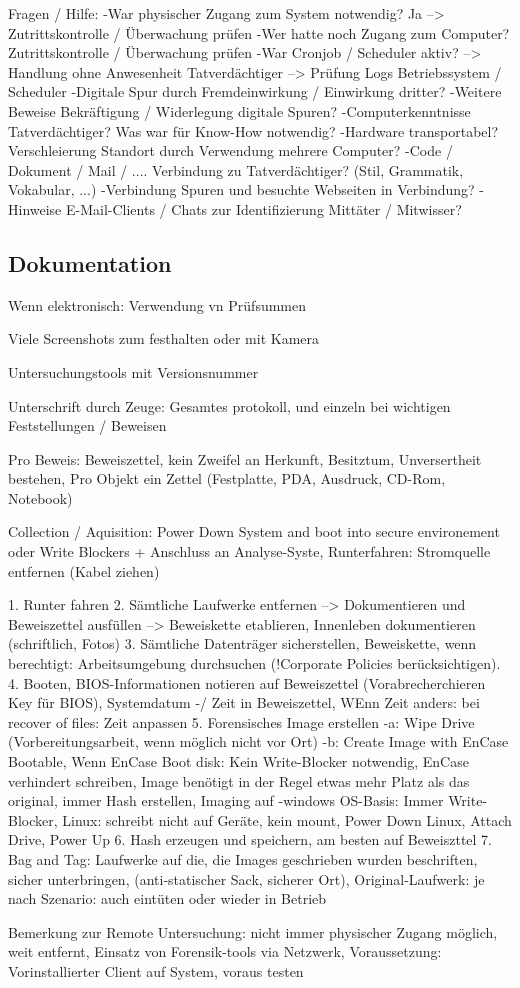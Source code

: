 Fragen / Hilfe:
-War physischer Zugang zum System notwendig? Ja --> Zutrittskontrolle / Überwachung prüfen
-Wer hatte noch Zugang zum Computer? Zutrittskontrolle / Überwachung prüfen
-War Cronjob / Scheduler aktiv? --> Handlung ohne Anwesenheit Tatverdächtiger --> Prüfung Logs Betriebssystem / Scheduler
-Digitale Spur durch Fremdeinwirkung / Einwirkung dritter?
-Weitere Beweise Bekräftigung / Widerlegung digitale Spuren?
-Computerkenntnisse Tatverdächtiger? Was war für Know-How notwendig?
-Hardware transportabel? Verschleierung Standort durch Verwendung mehrere Computer?
-Code / Dokument / Mail / .... Verbindung zu Tatverdächtiger? (Stil, Grammatik, Vokabular, ...)
-Verbindung Spuren und besuchte Webseiten in Verbindung?
-Hinweise E-Mail-Clients / Chats zur Identifizierung Mittäter / Mitwisser?

\subsection{Dokumentation}
Wenn elektronisch: Verwendung vn Prüfsummen

Viele Screenshots zum festhalten oder mit Kamera

Untersuchungstools mit Versionsnummer

Unterschrift durch Zeuge: Gesamtes protokoll, und einzeln bei wichtigen Feststellungen / Beweisen

Pro Beweis: Beweiszettel, kein Zweifel an Herkunft, Besitztum, Unversertheit bestehen, Pro Objekt ein Zettel (Festplatte, PDA, Ausdruck, CD-Rom, Notebook)


Collection / Aquisition:
Power Down System and boot into secure environement oder Write Blockers + Anschluss an Analyse-Syste, Runterfahren: Stromquelle entfernen (Kabel ziehen)

1. Runter fahren
2. Sämtliche Laufwerke entfernen --> Dokumentieren und Beweiszettel ausfüllen --> Beweiskette etablieren, Innenleben dokumentieren (schriftlich, Fotos)
3. Sämtliche Datenträger sicherstellen, Beweiskette, wenn berechtigt: Arbeitsumgebung durchsuchen (!Corporate Policies berücksichtigen). 
4. Booten, BIOS-Informationen notieren auf Beweiszettel (Vorabrecherchieren Key für BIOS), Systemdatum -/ Zeit in Beweiszettel, WEnn Zeit anders: bei recover of files: Zeit anpassen
5. Forensisches Image erstellen
-a: Wipe Drive (Vorbereitungsarbeit, wenn möglich nicht vor Ort)
-b: Create Image with EnCase Bootable, Wenn EnCase Boot disk: Kein Write-Blocker notwendig, EnCase verhindert schreiben, Image benötigt in der Regel etwas mehr Platz als das original, immer Hash erstellen, Imaging auf -windows OS-Basis: Immer Write-Blocker, Linux: schreibt nicht auf Geräte, kein mount, Power Down Linux, Attach Drive, Power Up
6.	Hash erzeugen und speichern, am besten auf Beweiszttel
7.	Bag and Tag: Laufwerke auf die, die Images geschrieben wurden beschriften, sicher unterbringen, (anti-statischer Sack, sicherer Ort), Original-Laufwerk: je nach Szenario: auch eintüten oder wieder in Betrieb

Bemerkung zur Remote Untersuchung: nicht immer physischer Zugang möglich, weit entfernt, Einsatz von Forensik-tools via Netzwerk, Voraussetzung: Vorinstallierter Client auf System, voraus testen